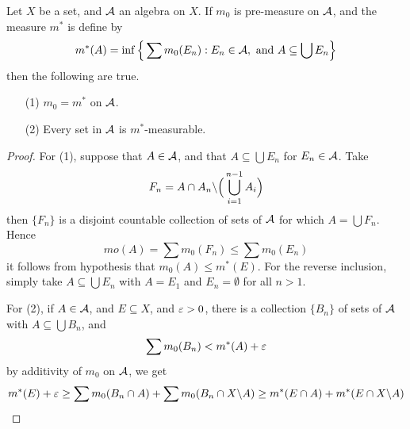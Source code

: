 \begin{lemma}\label{lemma_1.3.5}
    Let $X$ be a set, and  $\mathcal{A}$ an algebra on  $X$. If  $m_0$ is pre-measure on
    $\mathcal{A}$, and the measure $m^\ast$ is define by
    \begin{equation*}
        m^\ast(A)=\inf{\Big{\{} \sum{m_0(E_n)} : E_n \in \mathcal{A}, \text{ and }
       A \subseteq \bigcup{E_n} \Big{\}}}
    \end{equation*}
    then the following are true.
    \begin{enumerate}
        \item[(1)] $m_0=m^\ast$ on $\mathcal{A}$.

        \item[(2)] Every set in $\mathcal{A}$ is  $m^\ast$-measurable.
    \end{enumerate}
\end{lemma}
\begin{proof}
    For (1), suppose that $A \in \mathcal{A}$, and that $A \subseteq \bigcup{E_n}$ for
    $E_n \in \mathcal{A}$. Take
    \begin{equation*}
        F_n=A \cap A_n \backslash \Big{(} \bigcup_{i=1}^{n-1}{A_i} \Big{)}
    \end{equation*}
    then $\{F_n\}$ is a disjoint countable collection of sets of $\mathcal{A}$ for which
     $A=\bigcup{F_n}$. Hence
     \begin{equation*}
         mo(A)=\sum{m_0(F_n)} \leq \sum{m_0(E_n)}
     \end{equation*}
     it follows from hypothesis that $m_0(A) \leq m^\ast(E)$. For the reverse
     inclusion, simply take $A \subseteq \bigcup{E_n}$ with $A=E_1$ and
     $E_n=\emptyset$ for all  $n>1$.

     For (2), if $A \in \mathcal{A}$, and $E \subseteq X$, and $\varepsilon>0$, there is a
     collection  $\{B_n\}$ of sets of $\mathcal{A}$ with  $A \subseteq \bigcup{B_n}$,
     and
     \begin{equation*}
         \sum{m_0(B_n)}<m^\ast(A)+\varepsilon
     \end{equation*}
     by additivity of $m_0$ on $\mathcal{A}$, we get
     \begin{equation*}
         m^\ast(E)+\varepsilon \geq \sum{m_0(B_n \cap A)}+\sum{m_0(B_n \cap X \backslash A)}
                    \geq m^\ast(E \cap A)+m^\ast(E \cap X \backslash A)
     \end{equation*}
\end{proof}

